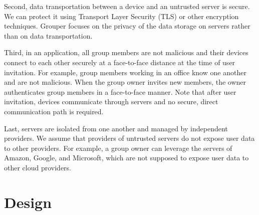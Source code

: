 \documentclass{sig-alternate-05-2015}
\begin{document}
Second, data transportation between a device and an untrusted server is secure.
We can protect it using Transport Layer Security (TLS) or other encryption techniques.
Grouper focuses on the privacy of the data storage on servers rather than on data transportation.

Third, in an application, all group members are not malicious and their devices connect to each other securely at a face-to-face distance at the time of user invitation.
For example, group members working in an office know one another and are not malicious.
When the group owner invites new members, the owner authenticates group members in a face-to-face manner.
Note that after user invitation, devices communicate through servers and no secure, direct communication path is required.

Last, servers are isolated from one another and managed by independent providers.
We assume that providers of untrusted servers do not expose user data to other providers.
For example, a group owner can leverage the servers of Amazon, Google, and Microsoft, which are not supposed to expose user data to other cloud providers.

\section{Design}
\end{document}
